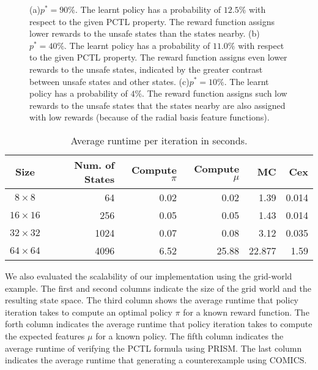 {\begin{figure}[!htb]
\caption[Reward mappings of gridworld for different safety threshold]
{(a)$p^* = 90\%$. The learnt policy has a probability of $12.5\%$ with respect to the given PCTL property. The reward function assigns lower rewards to the unsafe states than the states nearby. (b) $p^* = 40\%$. The learnt policy has a probability of $11.0\%$ with respect to the given PCTL property. The reward function assigns even lower rewards to the unsafe states, indicated by the greater contrast between unsafe states and other states. (c)$p^* = 10\%$. The learnt policy has a probability of $4\%$. The reward function assigns such low rewards to the unsafe states that the states nearby are also assigned with low rewards (because of the radial basis feature functions).}
\label{fig:grid_world2}
\end{figure}
\begin{table}[htb]
\begin{center}
\caption{Average runtime per iteration in seconds.}
\begin{tabular}{|c|r|r|r|r|r|}
\hline
Size & Num. of States & Compute $\pi$ & Compute $\mu$ & MC & Cex\\
\hline
$8 \times 8$ & 64 & 0.02 & 0.02 & 1.39 & 0.014\\
$16 \times 16$ & 256 & 0.05 & 0.05 & 1.43  & 0.014\\
$32 \times 32$ & 1024 & 0.07 & 0.08 & 3.12 & 0.035\\
$64 \times 64$ & 4096 & 6.52 & 25.88 &  22.877  & 1.59\\
\hline
\end{tabular}
\label{tab:grid-world}
\end{center}
\end{table}
We also evaluated the scalability of our implementation using the grid-world example. The first and second columns indicate the size of the grid world and the resulting state space. The third column shows the average runtime that policy iteration takes to compute an optimal policy $\pi$ for a known reward function. The forth column indicates the average runtime that policy iteration takes to compute the expected features $\mu$ for a known policy. The fifth column indicates the average runtime of verifying the PCTL formula using PRISM. The last column indicates the average runtime that generating a counterexample using COMICS.  


}
